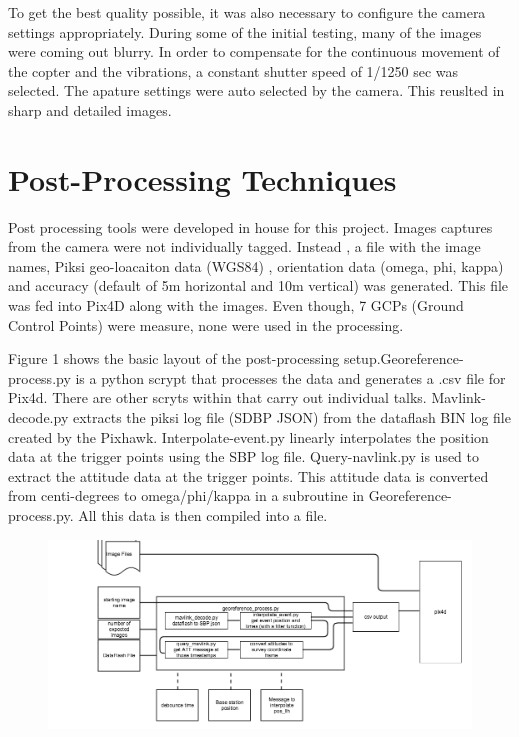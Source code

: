 \documentclass{article}
\begin{document}
To get the best quality possible, it was also necessary to configure the camera settings appropriately. During some of the initial testing, many of the images were coming out blurry. In order to compensate for the continuous movement of the copter and the vibrations, a constant shutter speed of 1/1250 sec was selected. The apature settings were auto selected by the camera. This reuslted in sharp and detailed images.

\section{Post-Processing Techniques}
\label{sec:epostprocessing}
Post processing tools were developed in house for this project. Images captures from the camera were not individually tagged. Instead , a file with the image names, Piksi geo-loacaiton data (WGS84) , orientation data (omega, phi, kappa) and accuracy (default of 5m horizontal and 10m vertical) was generated. This file was fed into Pix4D along with the images. Even though, 7 GCPs (Ground Control Points) were measure, none were used in the processing.

Figure 1 shows the basic layout of the post-processing setup.Georeference-process.py is a python scrypt that processes the data and generates a .csv file for Pix4d. There are other scryts within that carry out individual talks. Mavlink-decode.py extracts the piksi log file (SDBP JSON) from the dataflash BIN log file created by the Pixhawk. Interpolate-event.py linearly interpolates the position data at the trigger points using the SBP log file. Query-navlink.py is used to extract the attitude data at the trigger points. This attitude data is converted from centi-degrees to omega/phi/kappa in a subroutine in Georeference-process.py. All this data is then compiled into a file.


\begin{figure}
\begin{center}
\includegraphics[width=7in]{images/flow_charts/uav_survey_processing_architecture.png}
\end{center}
\end{figure}
\end{document}
